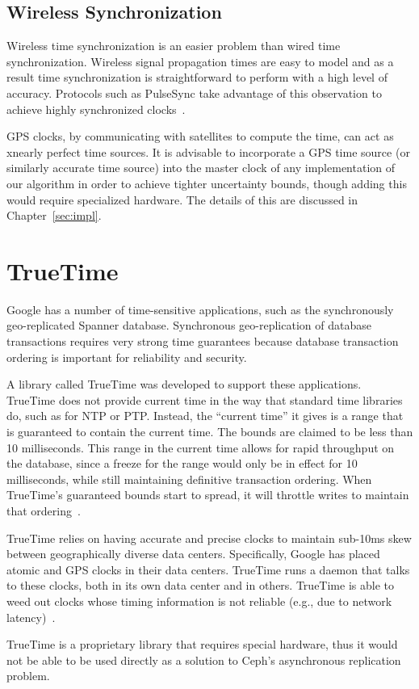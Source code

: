 \subsection{Wireless Synchronization}

Wireless time synchronization is an easier problem than wired time 
synchronization. Wireless signal propagation times are easy to model and as a
result time synchronization is straightforward to perform with a high level of
accuracy. Protocols such as PulseSync take advantage of this
observation to achieve highly synchronized clocks~\citep{Lenzen2010}.

GPS clocks, by communicating with satellites to compute the time, can act as 
xnearly perfect time sources. It is
advisable to incorporate a GPS time source (or similarly accurate time
source) into the master clock of any implementation of our algorithm
in order to achieve tighter uncertainty bounds, though adding this
would require specialized hardware.  The details of this are discussed
in Chapter~\ref{sec:impl}.

\section{TrueTime}

Google has a number of time-sensitive applications, such as the
synchronously geo-replicated Spanner database. Synchronous
geo-replication of database transactions requires very strong time
guarantees because database transaction ordering is important for
reliability and security.

A library called TrueTime was developed to support these applications.
TrueTime does not provide current time in the way that standard time
libraries do, such as for NTP or PTP. Instead, the ``current time'' it
gives is a range that is guaranteed to contain the current
time. The bounds are claimed to be less than 10
milliseconds. This range in the current time allows for rapid
throughput on the database, since a freeze for the range would only be in effect for 10 milliseconds, while still maintaining definitive
transaction ordering. When TrueTime's guaranteed bounds start to
spread, it will throttle writes to maintain that
ordering~\citep{Corbett2012}.

TrueTime relies on having accurate and precise clocks to
maintain sub-10ms skew between geographically diverse data
centers. Specifically, Google has placed atomic and GPS clocks in
their data centers. TrueTime runs a daemon that talks to these clocks,
both in its own data center and in others. TrueTime is able to weed
out clocks whose timing information is not reliable (e.g., due to
network latency)~\citep{Corbett2012}.

TrueTime is a proprietary library that requires special hardware, thus
it would not be able to be used directly as a solution to Ceph's
asynchronous replication problem.


